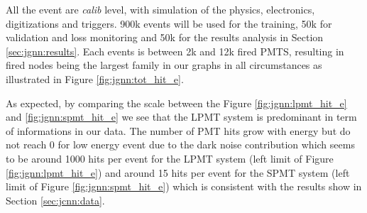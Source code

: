 \documentclass[../main.tex]{subfiles}
\begin{document}
All the event are \textit{calib} level, with simulation of the physics, electronics, digitizations and triggers. 900k events will be used for the training, 50k for validation and loss monitoring and 50k for the results analysis in Section \ref{sec:jgnn:results}. Each events is between 2k and 12k fired PMTS, resulting in fired nodes being the largest family in our graphs in all circumstances as illustrated in Figure \ref{fig:jgnn:tot_hit_e}.

As expected, by comparing the scale between the Figure \ref{fig:jgnn:lpmt_hit_e} and \ref{fig:jgnn:spmt_hit_e} we see that the LPMT system is predominant in term of informations in our data. The number of PMT hits grow with energy but do not reach 0 for low energy event due to the dark noise contribution which seems to be around 1000 hits per event for the LPMT system (left limit of Figure \ref{fig:jgnn:lpmt_hit_e}) and around 15 hits per event for the SPMT system (left limit of Figure \ref{fig:jgnn:spmt_hit_e}) which is consistent with the results show in Section \ref{sec:jcnn:data}.
\end{document}
